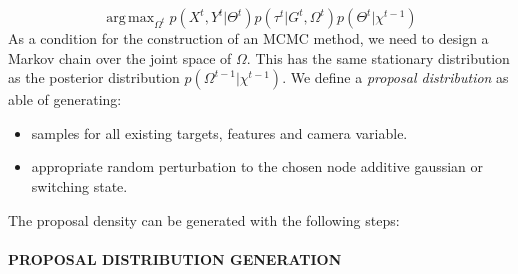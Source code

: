 \[
 \operatorname{arg\,max}_{\Omega^{t}} p(X^{t}, Y^t |\Theta^{t}) p(\tau^{t} | G^t ,\Omega^{t}) p(\Theta^{t} |\chi^{t-1}) 
\]
As a condition for the construction of an MCMC method, we need to design a Markov chain over the joint space of $\Omega$. 
This has the same stationary distribution as the posterior distribution 
$p(\Omega^{t-1} |\chi^{t-1})$. 
We define a \textit{proposal distribution} as able of generating:
\begin{itemize}
\item samples for all existing targets, features and camera variable. 
\item appropriate random perturbation to the chosen node additive gaussian or switching state.
\end{itemize}
The proposal density can be generated with the following steps: 
\\
\\
{\bf PROPOSAL DISTRIBUTION GENERATION}\\[.4cm]
